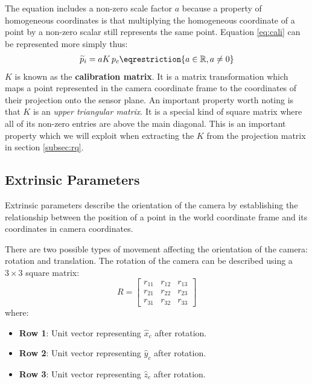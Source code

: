 The equation includes a non-zero scale factor $a$ because a property of homogeneous coordinates is that multiplying the homogeneous coordinate of a point by a non-zero scalar still represents the same point. Equation \ref{eq:cali} can be represented more simply thus:
\begin{gather}
    \widetilde{p}_i = aK\, p_c \label{eq:pi} \eqrestriction{a \in \Real, a \neq 0}
\end{gather}
$K$ is known as the \textbf{calibration matrix}. It is a matrix transformation which maps a point represented in the camera coordinate frame to the coordinates of their projection onto the sensor plane. An important property worth noting is that $K$ is an \emph{upper triangular matrix}. It is a special kind of square matrix where all of its non-zero entries are above the main diagonal. This is an important property which we will exploit when extracting the $K$ from the projection matrix in section \ref{subsec:rq}.

\subsection{Extrinsic Parameters} \label{sec:extrinsics}

Extrinsic parameters describe the orientation of the camera by establishing the relationship between the position of a point in the world coordinate frame and its coordinates in camera coordinates.

There are two possible types of movement affecting the orientation of the camera: rotation and translation. The rotation of the camera can be described using a $3 \times 3$ square matrix:
\begin{equation}
    R =
    \begin{bmatrix}
        r_{11} & r_{12} & r_{13} \\
        r_{21} & r_{22} & r_{23} \\
        r_{31} & r_{32} & r_{33}
    \end{bmatrix}
\end{equation}
\noindent where:
\begin{itemize}
    \item \textbf{Row 1}: Unit vector representing $\hat{x}_c$ after rotation.
    \item \textbf{Row 2}: Unit vector representing $\hat{y}_c$ after rotation.
    \item \textbf{Row 3}: Unit vector representing $\hat{z}_c$ after rotation.
\end{itemize}

